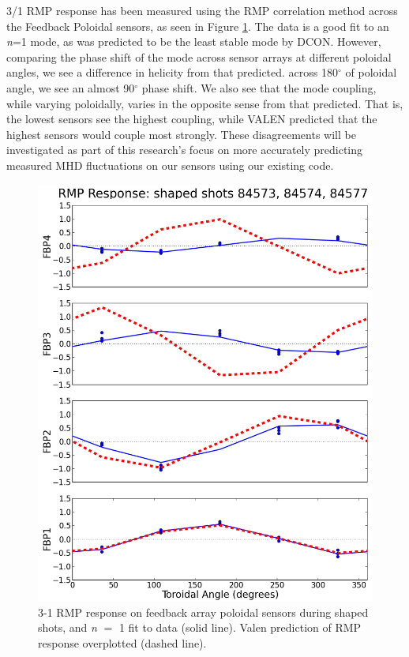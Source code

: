 \documentclass[aps,prl,twocolumn,superscriptaddress,groupedaddress]{revtex4}  %
\begin{document}
3/1 RMP response has been measured using the RMP correlation method across the Feedback Poloidal sensors, as seen in Figure \ref{RMP_response}.  The data is a good fit to an \textit{n}=1 mode, as was predicted to be the least stable mode by DCON.  However, comparing the phase shift of the mode across sensor arrays at different poloidal angles, we see a difference in helicity from that predicted.  across 180$^{\circ}$ of poloidal angle, we see an almost 90$^{\circ}$ phase shift.  We also see that the mode coupling, while varying poloidally, varies in the opposite sense from that predicted.  That is, the lowest sensors see the highest coupling, while VALEN predicted that the highest sensors would couple most strongly.  These disagreements will be investigated as part of this research's focus on more accurately predicting measured MHD fluctuations on our sensors using our existing code.
	
\begin{figure}[htb]
	\centering
\includegraphics[scale=.35]{../Plots/RMP_response_meas_vs_sim.png}\caption{3-1 RMP response on feedback array poloidal sensors during shaped shots, and \textit{n} $=$ 1 fit to data (solid line).  Valen prediction of RMP response overplotted (dashed line).}
	\label{RMP_response}
	\end{figure}
	
\end{document}
